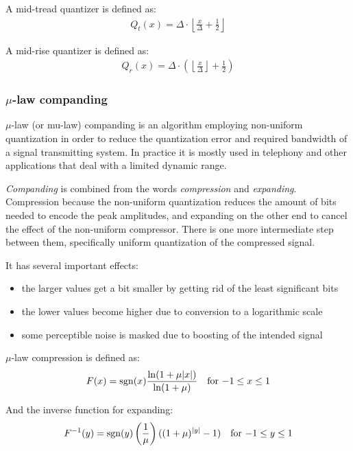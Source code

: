 A mid-tread quantizer is defined as:
\begin{align}
Q_t(x) = \Delta \cdot \left\lfloor \frac{x}{\Delta} + \frac12 \right\rfloor
\end{align}

A mid-rise quantizer is defined as:
\begin{align}
Q_r(x) = \Delta \cdot \left( \left\lfloor \frac{x}{\Delta} \right\rfloor + \frac12 \right)
\end{align}

\subsubsection{$\mu$-law companding}
\label{sec:mulaw}
$\mu$-law (or mu-law) companding is an algorithm employing non-uniform quantization in order to reduce the quantization error and required bandwidth of a signal transmitting system. In practice it is mostly used in telephony and other applications that deal with a limited dynamic range.

\emph{Companding} is combined from the words \emph{compression} and \emph{expanding}. Compression because the non-uniform quantization reduces the amount of bits needed to encode the peak amplitudes, and expanding on the other end to cancel the effect of the non-uniform compressor. There is one more intermediate step between them, specifically uniform quantization of the compressed signal. \cite{brokish_lewis_1997}

It has several important effects:
\begin{itemize}
	\item the larger values get a bit smaller by getting rid of the least significant bits
	\item the lower values become higher due to conversion to a logarithmic scale
	\item some perceptible noise is masked due to boosting of the intended signal
\end{itemize}

$\mu$-law compression is defined as: \cite{cisco_2017}
\begin{align}
F(x) &= \operatorname{sgn}(x) \frac{\ln(1+\mu|x|)}{\ln(1+\mu)} & \text{for $-1 \le x \le 1$}
\end{align}

And the inverse function for expanding:
\begin{align}
F^{-1}(y) &= \operatorname{sgn}(y)\left(\frac{1}{\mu}\right)((1+\mu)^{|y|}-1) & \text{for $-1 \le y \le 1$}
\end{align}

